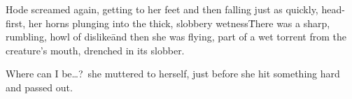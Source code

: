 Hode screamed again, getting to her feet and then falling just as quickly, head-first, her horns plunging into the 
thick, slobbery wetness\=

There was a sharp, rumbling, howl of dislike\=and then she was flying, part of a wet torrent from the 
creature's mouth, drenched in its slobber.

Where can I be\ldots?~she muttered to herself, just before she hit something hard and passed out.

